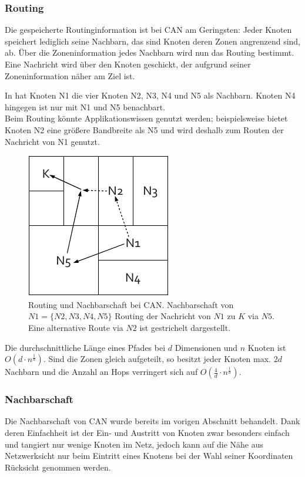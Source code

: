 \subsubsection*{Routing} 
Die gespeicherte Routinginformation ist bei CAN am Geringsten: Jeder Knoten speichert lediglich seine Nachbarn, das sind Knoten deren Zonen angrenzend sind, ab. Über die Zoneninformation jedes Nachbarn wird nun das Routing bestimmt. Eine Nachricht wird über den Knoten geschickt, der aufgrund seiner Zoneninformation näher am Ziel ist.

In  hat Knoten N1 die vier Knoten N2, N3, N4 und N5 als Nachbarn. Knoten N4 hingegen ist nur mit N1 und N5 benachbart.\\
Beim Routing könnte Applikationswissen genutzt werden; beispielsweise bietet Knoten N2 eine größere Bandbreite als N5 und wird deshalb zum Routen der Nachricht von N1 genutzt. 

\begin{figure}[htbp]
\centering
\includegraphics{grafics/can_routing.pdf}
\caption{Routing und Nachbarschaft bei CAN. Nachbarschaft von $N1 = \{N2, N3, N4, N5\}$ Routing der Nachricht von $N1$ zu $K$ via $N5$. Eine alternative Route via $N2$ ist gestrichelt dargestellt.}
\label{fig:can_routing}
\end{figure}

Die durchschnittliche Länge eines Pfades bei $d$ Dimensionen und $n$ Knoten ist $O(d\cdot n^\frac{1}{d})$. Sind die Zonen gleich aufgeteilt, so besitzt jeder Knoten max. $2d$ Nachbarn und die Anzahl an Hops verringert sich auf $O(\frac{4}{d}\cdot n^\frac{1}{d})$.

\subsubsection*{Nachbarschaft}
Die Nachbarschaft von CAN wurde bereits im vorigen Abschnitt behandelt. Dank deren Einfachheit ist der Ein- und Austritt von Knoten zwar besonders einfach und tangiert nur wenige Knoten im Netz, jedoch kann auf die Nähe aus Netzwerksicht nur beim Eintritt eines Knotens bei der Wahl seiner Koordinaten Rücksicht genommen werden.

